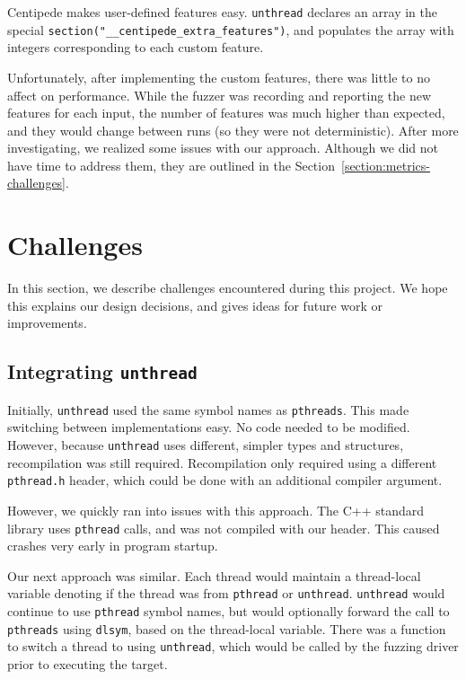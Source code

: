 \documentclass{article}
\begin{document}
Centipede makes user-defined features easy. \texttt{unthread} declares an array in the special \texttt{section("\_\_centipede\_extra\_features")}, and populates the array with integers corresponding to each custom feature.

Unfortunately, after implementing the custom features, there was little to no affect on performance. While the fuzzer was recording and reporting the new features for each input, the number of features was much higher than expected, and they would change between runs (so they were not deterministic). After more investigating, we realized some issues with our approach. Although we did not have time to address them, they are outlined in the Section~\ref{section:metrics-challenges}.

\section{Challenges}

In this section, we describe challenges encountered during this project. We hope this explains our design decisions, and gives ideas for future work or improvements.

\subsection{Integrating \texttt{unthread}}

Initially, \texttt{unthread} used the same symbol names as \texttt{pthreads}. This made switching between implementations easy. No code needed to be modified. However, because \texttt{unthread} uses different, simpler types and structures, recompilation was still required. Recompilation only required using a different \texttt{pthread.h} header, which could be done with an additional compiler argument.

However, we quickly ran into issues with this approach. The C++ standard library uses \texttt{pthread} calls, and was not compiled with our header. This caused crashes very early in program startup. 

Our next approach was similar. Each thread would maintain a thread-local variable denoting if the thread was from \texttt{pthread} or \texttt{unthread}. \texttt{unthread} would continue to use \texttt{pthread} symbol names, but would optionally forward the call to \texttt{pthreads} using \texttt{dlsym}, based on the thread-local variable. There was a function to switch a thread to using \texttt{unthread}, which would be called by the fuzzing driver prior to executing the target. 
\end{document}
